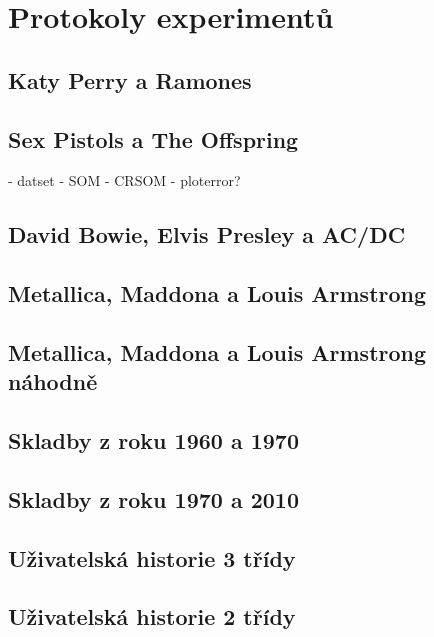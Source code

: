 \documentclass[thesis=M,czech]{FITthesis}[2012/06/26]
\begin{document}
\chapter{Protokoly experimentů}\label{app:protocols}


\section{Katy Perry a Ramones}\label{exp:kat-ram}

\section{Sex Pistols a The Offspring}\label{exp:sexp-off}

- datset
- SOM
- CRSOM
- ploterror?

\section{David Bowie, Elvis Presley a AC/DC}\label{exp:db-ep-acdc}


\section{Metallica, Maddona a Louis Armstrong}\label{exp:met-mad-la}

\section{Metallica, Maddona a Louis Armstrong náhodně}\label{exp:met-mad-la-random}







\section{Skladby z roku 1960 a 1970}\label{exp:60-vs-70}


\section{Skladby z roku 1970 a 2010}\label{exp:70-vs-10}

\section{Uživatelská historie 3 třídy}\label{exp:user1}


\section{Uživatelská historie 2 třídy}\label{exp:user2}
\end{document}
